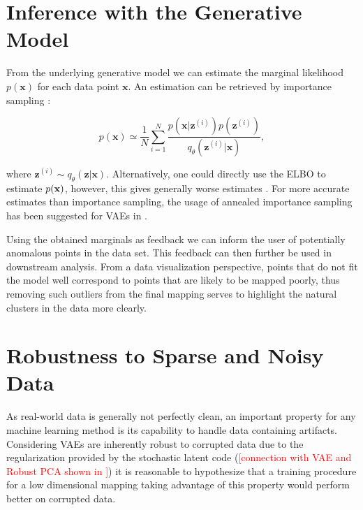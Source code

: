 \section{Inference with the Generative Model}
\label{section:inference_with_the_generative_model}

From the underlying generative model we can estimate the marginal likelihood $p(\mathbf{x})$ for each data point $\mathbf{x}$. An estimation can be retrieved by importance sampling \cite{stochastic_backpropagation}:

$$p(\mathbf{x}) \simeq \frac{1}{N} \sum_{i=1}^{N} \frac{p(\mathbf{x} \vert \mathbf{z}^{(i)}) p(\mathbf{z}^{(i)})}{q_{\theta}(\mathbf{z}^{(i)} \vert \mathbf{x})},$$

where $\mathbf{z}^{(i)} \sim q_{\theta}(\mathbf{z} \vert \mathbf{x})$. Alternatively, one could directly use the ELBO to estimate $p(\mathbf{x})$, however, this gives generally worse estimates \cite{ais_vae}. For more accurate estimates than importance sampling, the usage of annealed importance sampling \cite{ais} has been suggested for VAEs in \cite{ais_vae}.

Using the obtained marginals as feedback we can inform the user of potentially anomalous points in the data set. This feedback can then further be used in downstream analysis. From a data visualization perspective, points that do not fit the model well correspond to points that are likely to be mapped poorly, thus removing such outliers from the final mapping serves to highlight the natural clusters in the data more clearly.

\section{Robustness to Sparse and Noisy Data}
\label{section:robustness}


As real-world data is generally not perfectly clean, an important property for any machine learning method is its capability to handle data containing artifacts. Considering VAEs are inherently robust to corrupted data due to the regularization provided by the stochastic latent code (\textcolor{red}{[connection with VAE and Robust PCA \cite{rpca_1, rpca_2} shown in \citep{hidden_talents_of_the_vae}]}) it is reasonable to hypothesize that a training procedure for a low dimensional mapping taking advantage of this property would perform better on corrupted data.

